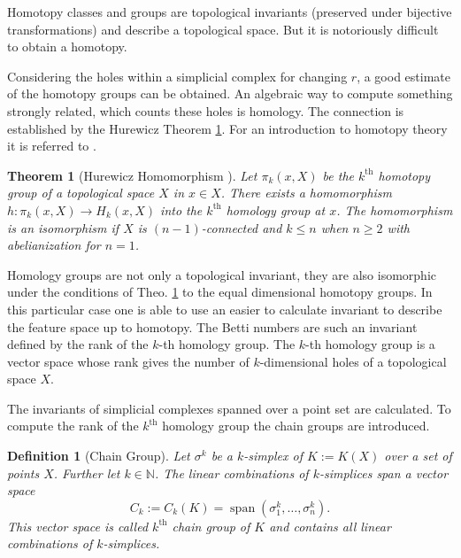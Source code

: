 \documentclass[journal]{IEEEtran}
\DeclareMathOperator{\SP}{span}
\newtheorem{theorem}{Theorem}[section]
\newtheorem{definition}{Definition}[section]
\begin{document}
Homotopy classes and groups are topological invariants (preserved under bijective transformations) and describe a topological space. But it is notoriously difficult to obtain a homotopy.

Considering the holes within a simplicial complex for changing $r$, a good estimate of the homotopy groups can be obtained. An algebraic way to compute something strongly related, which counts these holes is homology. The connection is established by the Hurewicz Theorem \ref{hurewicz}. For an introduction to homotopy theory it is referred to \cite{goerss2009simplicial, whitehead2012elements,gray1975homotopy}.

\begin{theorem}[Hurewicz Homomorphism \cite{hatcher2005algebraic}]
\label{hurewicz}
Let $\pi_k(x,X)$ be the $k^{\text{th}}$ homotopy group of a topological space $X$ in $x \in X$. There exists a homomorphism $h: \pi_k(x,X) \rightarrow H_k(x,X)$ into the $k^{\text{th}}$ homology group at $x$. The homomorphism is an isomorphism if $X$ is $(n-1)$-connected and $k \leq n$ when $n \geq 2$ with abelianization for $n = 1$.
\end{theorem}

Homology groups are not only a topological invariant, they are also isomorphic under the conditions of Theo. \ref{hurewicz} to the equal dimensional homotopy groups. In this particular case one is able to use an easier to calculate invariant to describe the feature space up to homotopy. The Betti numbers are such an invariant defined by the rank of the $k$-th homology group. The $k$-th homology group is a vector space whose rank gives the number of $k$-dimensional holes of a topological space $X$.

The invariants of simplicial complexes spanned over a point set are calculated. To compute the rank of the $k^{\text{th}}$ homology group the chain groups are introduced.

\begin{definition}[Chain Group]
Let $\sigma^k$ be a $k$-simplex of $K := K(X)$ over a set of points $X$. Further let $k \in \mathbb{N}$. The linear combinations of $k$-simplices span a vector space
\begin{equation}
C_k := C_k(K) = \SP\left(\sigma_1^k, \ldots, \sigma_n^k\right).
\end{equation}
This vector space is called $k^{\text{th}}$ chain group of $K$ and contains all linear combinations of $k$-simplices.
\end{definition}
\end{document}
